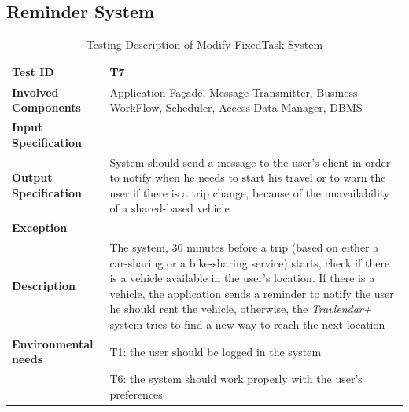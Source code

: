 \subsection*{Reminder System}

\begin{table}[H]
    \centering
    \begin{tabular}{p{4.55cm} p{7cm}}
        
        \hline
        
        \textbf{Test ID}                & T7 \\
        
        \hline
        
        \textbf{Involved Components}    & Application Façade, Message Transmitter, Business                                                            WorkFlow, Scheduler, Access Data Manager, DBMS\\
        
        \hline
        
        \textbf{Input Specification}    & \\
        
        \hline
        
        \textbf{Output Specification}   & System should send a message to the user's client in order to notify when he needs to start his travel or to warn the user if there is a trip change, because of the unavailability of a shared-based vehicle\\
        
        \hline
        
        \textbf{Exception}              & \\
        
        \hline
        
        \textbf{Description}            & The system, 30 minutes before a trip (based on either a car-sharing or a bike-sharing service) starts, check if there is a vehicle available in the user's location. If there is a vehicle, the application sends a reminder to notify the user he should rent the vehicle, otherwise, the \emph{Travlendar+} system tries to find a new way to reach the next location\\
        \hline
        
        \textbf{Environmental needs}    & T1: the user should be logged in the system\\
                                        & T6: the system should work properly with the user's preferences \\
        
        \hline
        
    \end{tabular}
    \caption{Testing Description of Modify FixedTask System}
    
\end{table}




